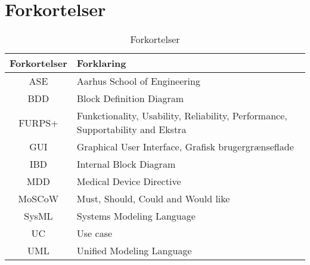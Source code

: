 \chapter{Forkortelser}

\begin{table}[htb]
\centering
\begin{tabular}{ | c | p{} | }
\hline
\textbf{Forkortelser} & \textbf{Forklaring} \\\hline
ASE & Aarhus School of Engineering \\\hline
BDD & Block Definition Diagram \\\hline
FURPS+ & Funkctionality, Usability, Reliability, Performance, Supportability and Ekstra \\\hline
GUI & Graphical User Interface, Grafisk brugergrænseflade \\\hline
IBD & Internal Block Diagram \\\hline
MDD & Medical Device Directive \\\hline
MoSCoW & Must, Should, Could and Would like \\\hline
SysML & Systems Modeling Language \\\hline
UC & Use case \\\hline
UML & Unified Modeling Language \\\hline
\end{tabular}
\caption{Forkortelser}
\end{table}

\vspace{3cm}